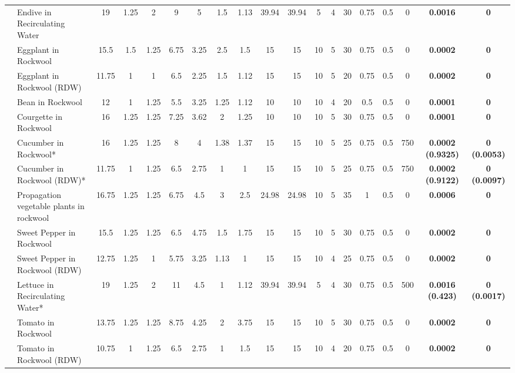 \documentclass[
  letterpaper,
  DIV=11,
  numbers=noendperiod]{scrreprt}
\begin{document}
\begin{landscape}
\begin{longtable}[t]{llccccccccccccccc>{}c>{}c}
\endfoot
\bottomrule
\endlastfoot
 & Endive in Recirculating Water & 19 & 1.25 & 2 & 9 & 5 & 1.5 & 1.13 & 39.94 & 39.94 & 5 & 4 & 30 & 0.75 & 0.5 & 0 & \textbf{0.0016} & \textbf{0}\\
\nopagebreak
 & Eggplant in Rockwool & 15.5 & 1.5 & 1.25 & 6.75 & 3.25 & 2.5 & 1.5 & 15 & 15 & 10 & 5 & 30 & 0.75 & 0.5 & 0 & \textbf{0.0002} & \textbf{0}\\
\nopagebreak
 & Eggplant in Rockwool (RDW) & 11.75 & 1 & 1 & 6.5 & 2.25 & 1.5 & 1.12 & 15 & 15 & 10 & 5 & 20 & 0.75 & 0.5 & 0 & \textbf{0.0002} & \textbf{0}\\
\nopagebreak
 & Bean in Rockwool & 12 & 1 & 1.25 & 5.5 & 3.25 & 1.25 & 1.12 & 10 & 10 & 10 & 4 & 20 & 0.5 & 0.5 & 0 & \textbf{0.0001} & \textbf{0}\\
\nopagebreak
 & Courgette in Rockwool & 16 & 1.25 & 1.25 & 7.25 & 3.62 & 2 & 1.25 & 10 & 10 & 10 & 5 & 30 & 0.75 & 0.5 & 0 & \textbf{0.0001} & \textbf{0}\\
\nopagebreak
 & Cucumber in Rockwool* & 16 & 1.25 & 1.25 & 8 & 4 & 1.38 & 1.37 & 15 & 15 & 10 & 5 & 25 & 0.75 & 0.5 & 750 & \textbf{0.0002 (0.9325)} & \textbf{0 (0.0053)}\\
\nopagebreak
 & Cucumber in Rockwool (RDW)* & 11.75 & 1 & 1.25 & 6.5 & 2.75 & 1 & 1 & 15 & 15 & 10 & 5 & 25 & 0.75 & 0.5 & 750 & \textbf{0.0002 (0.9122)} & \textbf{0 (0.0097)}\\
\nopagebreak
 & Propagation vegetable plants in rockwool & 16.75 & 1.25 & 1.25 & 6.75 & 4.5 & 3 & 2.5 & 24.98 & 24.98 & 10 & 5 & 35 & 1 & 0.5 & 0 & \textbf{0.0006} & \textbf{0}\\
\nopagebreak
 & Sweet Pepper in Rockwool & 15.5 & 1.25 & 1.25 & 6.5 & 4.75 & 1.5 & 1.75 & 15 & 15 & 10 & 5 & 30 & 0.75 & 0.5 & 0 & \textbf{0.0002} & \textbf{0}\\
\nopagebreak
 & Sweet Pepper in Rockwool (RDW) & 12.75 & 1.25 & 1 & 5.75 & 3.25 & 1.13 & 1 & 15 & 15 & 10 & 4 & 25 & 0.75 & 0.5 & 0 & \textbf{0.0002} & \textbf{0}\\
\nopagebreak
 & Lettuce in Recirculating Water* & 19 & 1.25 & 2 & 11 & 4.5 & 1 & 1.12 & 39.94 & 39.94 & 5 & 4 & 30 & 0.75 & 0.5 & 500 & \textbf{0.0016 (0.423)} & \textbf{0 (0.0017)}\\
\nopagebreak
 & Tomato in Rockwool & 13.75 & 1.25 & 1.25 & 8.75 & 4.25 & 2 & 3.75 & 15 & 15 & 10 & 5 & 30 & 0.75 & 0.5 & 0 & \textbf{0.0002} & \textbf{0}\\
\nopagebreak
\multirow[t]{-13}{*}{\raggedright\arraybackslash Olericulture} & Tomato in Rockwool (RDW) & 10.75 & 1 & 1.25 & 6.5 & 2.75 & 1 & 1.5 & 15 & 15 & 10 & 4 & 20 & 0.75 & 0.5 & 0 & \textbf{0.0002} & \textbf{0}\\

\end{longtable}
\end{landscape}
\end{document}
